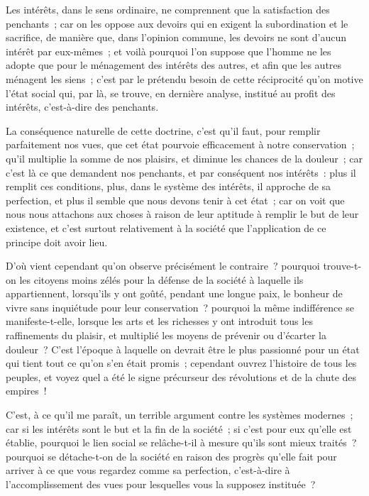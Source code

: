 \documentclass[french,twoside]{book} %
\newcommand\chaptercont{} %
\begin{document}
\chaptercont
\noindent Les intérêts, dans le sens ordinaire, ne comprennent que la satisfaction des penchants ; car on les oppose aux devoirs qui en exigent la subordination et le sacrifice, de manière que, dans l’opinion commune, les devoirs ne sont d’aucun intérêt par eux-mêmes ; et voilà pourquoi l’on suppose que l’homme ne les adopte que pour le ménagement des intérêts des autres, et afin que les autres ménagent les siens ; c’est par le prétendu besoin de cette réciprocité qu’on motive l’état social qui, par là, se trouve, en dernière analyse, institué au profit des intérêts, c’est-à-dire des penchants.\par
La conséquence naturelle de cette doctrine, c’est qu’il faut, pour remplir parfaitement nos vues, que cet état pourvoie efficacement à notre conservation ; qu’il multiplie la somme de nos plaisirs, et diminue les chances de la douleur ; car c’est là ce que demandent nos penchants, et par conséquent nos intérêts : plus il remplit ces conditions, plus, dans le système des intérêts, il approche de sa perfection, et plus il semble que nous devons tenir à cet état ; car on voit que nous nous attachons aux choses à raison de leur aptitude à remplir le but de leur existence, et c’est surtout relativement à la société que l’application de ce principe doit avoir lieu.\par
D’où vient cependant qu’on observe précisément le contraire ? pourquoi trouve-t-on les citoyens moins zélés pour la défense de la société à laquelle ils appartiennent, lorsqu’ils y ont goûté, pendant une longue paix, le bonheur de vivre sans inquiétude pour leur conservation ? pourquoi la même indifférence se manifeste-t-elle, lorsque les arts et les richesses y ont introduit tous les raffinements du plaisir, et multiplié les moyens de prévenir ou d’écarter la douleur ? C’est l’époque à laquelle on devrait être le plus passionné pour un état qui tient tout ce qu’on s’en était promis ; cependant ouvrez l’histoire de tous les peuples, et voyez quel a été le signe précurseur des révolutions et de la chute des empires !\par
C’est, à ce qu’il me paraît, un terrible argument contre les systèmes modernes ; car si les intérêts sont le but et la fin de la société ; si c’est pour eux qu’elle est établie, pourquoi le lien social se relâche-t-il à mesure qu’ils sont mieux traités ? pourquoi se détache-t-on de la société en raison des progrès qu’elle fait pour arriver à ce que vous regardez comme sa perfection, c’est-à-dire à l’accomplissement des vues pour lesquelles vous la supposez instituée ?\par
\end{document}
